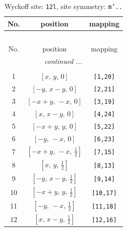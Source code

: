 \documentclass[fleqn,8pt]{jsarticle}
\begin{document}
\begin{longtable}{ccc}
\caption{Wyckoff site: {\tt 12l}, site symmetry: {\tt m'..}}
 \\
 \hline \hline
No. & position & mapping \\ \hline \endfirsthead

\multicolumn{2}{l}{\tablename\ \thetable{}} \\
 \hline \hline
No. & position & mapping \\ \hline \endhead

 \hline \hline
\multicolumn{2}{r}{\footnotesize\it continued ...} \\ \endfoot

 \hline \hline
\multicolumn{2}{r}{} \\ \endlastfoot

1 & $\left[ x,\, y,\, 0 \right]$ & {\tt [1,20]} \\ \hline
2 & $\left[ - y,\, x - y,\, 0 \right]$ & {\tt [2,21]} \\ \hline
3 & $\left[ - x + y,\, - x,\, 0 \right]$ & {\tt [3,19]} \\ \hline
4 & $\left[ x,\, x - y,\, 0 \right]$ & {\tt [4,24]} \\ \hline
5 & $\left[ - x + y,\, y,\, 0 \right]$ & {\tt [5,22]} \\ \hline
6 & $\left[ - y,\, - x,\, 0 \right]$ & {\tt [6,23]} \\ \hline
7 & $\left[ - x + y,\, - x,\, \frac{1}{2} \right]$ & {\tt [7,15]} \\ \hline
8 & $\left[ x,\, y,\, \frac{1}{2} \right]$ & {\tt [8,13]} \\ \hline
9 & $\left[ - y,\, x - y,\, \frac{1}{2} \right]$ & {\tt [9,14]} \\ \hline
10 & $\left[ - x + y,\, y,\, \frac{1}{2} \right]$ & {\tt [10,17]} \\ \hline
11 & $\left[ - y,\, - x,\, \frac{1}{2} \right]$ & {\tt [11,18]} \\ \hline
12 & $\left[ x,\, x - y,\, \frac{1}{2} \right]$ & {\tt [12,16]} \\
\end{longtable}
\renewcommand{\arraystretch}{1.2}
\end{document}
